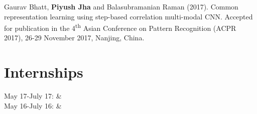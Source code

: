 \documentclass[]{cv-roald}
\begin{document}
Gaurav Bhatt, \textbf{Piyush Jha} and Balasubramanian Raman (2017). Common representation learning using step-based correlation multi-modal CNN. Accepted for publication in the 4\textsuperscript{th} Asian Conference on Pattern Recognition (ACPR 2017), 26-29 November 2017, Nanjing, China.

\section*{Internships}
\begin{tabularcv}
        May 17-July 17:   &   
                    \\[\vspacepar] %
        May 16-July 16:   &   
\end{tabularcv}   
\end{document}
